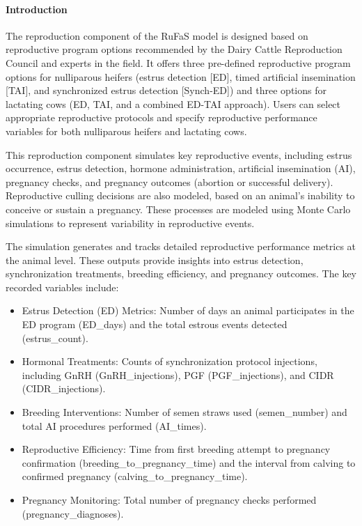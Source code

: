 \documentclass{article}
\begin{document}
\begin{refsection}
    \paragraph{Introduction} The reproduction component of the RuFaS model is designed based on reproductive program options recommended by the Dairy Cattle Reproduction Council \parencite{dcrc_protocols} and experts in the field. It offers three pre-defined reproductive program options for nulliparous heifers (estrus detection [ED], timed artificial insemination [TAI], and synchronized estrus detection [Synch-ED]) and three options for lactating cows (ED, TAI, and a combined ED-TAI approach). Users can select appropriate reproductive protocols and specify reproductive performance variables for both nulliparous heifers and lactating cows.
    
    \vspace{0.20cm}This reproduction component simulates key reproductive events, including estrus occurrence, estrus detection, hormone administration, artificial insemination (AI), pregnancy checks, and pregnancy outcomes (abortion or successful delivery). Reproductive culling decisions are also modeled, based on an animal's inability to conceive or sustain a pregnancy. These processes are modeled using Monte Carlo simulations to represent variability in reproductive events.

    \vspace{0.2cm}The simulation generates and tracks detailed reproductive performance metrics at the animal level. These outputs provide insights into estrus detection, synchronization treatments, breeding efficiency, and pregnancy outcomes. The key recorded variables include:
    \begin{itemize}
        \item Estrus Detection (ED) Metrics: Number of days an animal participates in the ED program (ED\_days) and the total estrous events detected (estrus\_count).
        \item Hormonal Treatments: Counts of synchronization protocol injections, including GnRH (GnRH\_injections), PGF (PGF\_injections), and CIDR (CIDR\_injections).
        \item Breeding Interventions: Number of semen straws used (semen\_number) and total AI procedures performed (AI\_times).
        \item Reproductive Efficiency: Time from first breeding attempt to pregnancy confirmation (breeding\_to\_pregnancy\_time) and the interval from calving to confirmed pregnancy (calving\_to\_pregnancy\_time).
        \item Pregnancy Monitoring: Total number of pregnancy checks performed (pregnancy\_diagnoses).
    \end{itemize}


\end{refsection}
\end{document}
